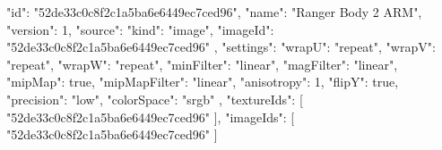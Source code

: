 {
  "id": "52de33c0c8f2c1a5ba6e6449ec7ced96",
  "name": "Ranger Body 2 ARM",
  "version": 1,
  "source": {
    "kind": "image",
    "imageId": "52de33c0c8f2c1a5ba6e6449ec7ced96"
  },
  "settings": {
    "wrapU": "repeat",
    "wrapV": "repeat",
    "wrapW": "repeat",
    "minFilter": "linear",
    "magFilter": "linear",
    "mipMap": true,
    "mipMapFilter": "linear",
    "anisotropy": 1,
    "flipY": true,
    "precision": "low",
    "colorSpace": "srgb"
  },
  "textureIds": [
    "52de33c0c8f2c1a5ba6e6449ec7ced96"
  ],
  "imageIds": [
    "52de33c0c8f2c1a5ba6e6449ec7ced96"
  ]
}
